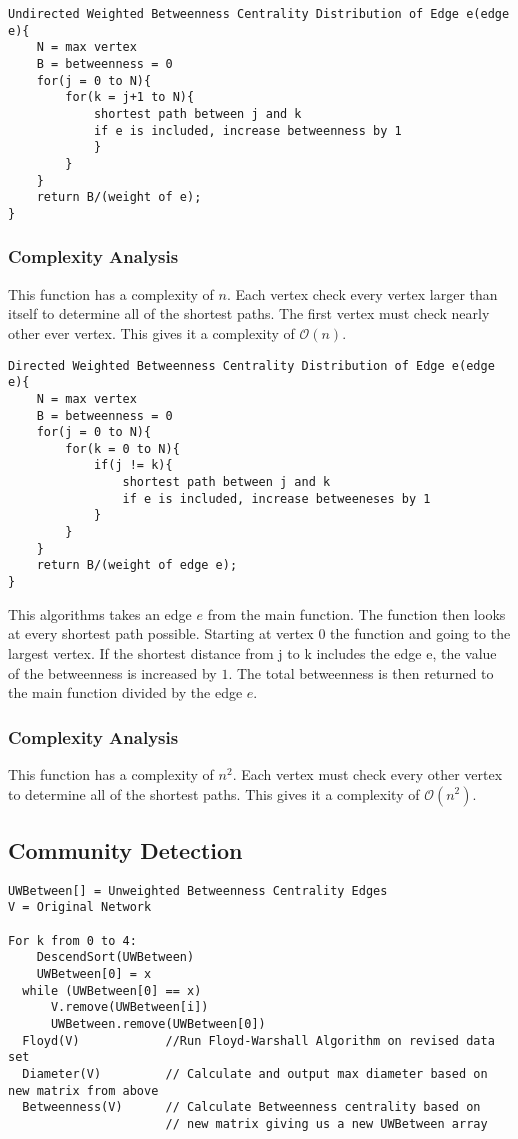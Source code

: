 \documentclass{article}
\begin{document}
\begin{verbatim}
Undirected Weighted Betweenness Centrality Distribution of Edge e(edge e){
    N = max vertex
    B = betweenness = 0
    for(j = 0 to N){
        for(k = j+1 to N){
            shortest path between j and k
            if e is included, increase betweenness by 1
            }
        }
    }
    return B/(weight of e);
}
\end{verbatim}

\subsubsection{Complexity Analysis}
This function has a complexity of $n$. Each vertex check every vertex larger than itself to determine all of the shortest paths. The first vertex must check nearly other ever vertex. This gives it a complexity of $\mathcal{O}(n)$.

\begin{verbatim}
Directed Weighted Betweenness Centrality Distribution of Edge e(edge e){
    N = max vertex
    B = betweenness = 0
    for(j = 0 to N){
        for(k = 0 to N){
            if(j != k){
                shortest path between j and k
                if e is included, increase betweeneses by 1
            }
        }
    }
    return B/(weight of edge e);
}
\end{verbatim}

This algorithms takes an edge $e$ from the main function. The function then looks at every shortest path possible. Starting at vertex $0$ the function and going to the largest vertex. If the shortest distance from j to k includes the edge e, the value of the betweenness is increased by $1$. The total betweenness is then returned to the main function divided by the edge $e$.

\subsubsection{Complexity Analysis}
This function has a complexity of $n^2$. Each vertex must check every other vertex to determine all of the shortest paths. This gives it a complexity of $\mathcal{O}(n^2)$.

\subsection{Community Detection}
\begin{verbatim}
UWBetween[] = Unweighted Betweenness Centrality Edges
V = Original Network

For k from 0 to 4:
    DescendSort(UWBetween)
    UWBetween[0] = x
  while (UWBetween[0] == x)
      V.remove(UWBetween[i])
      UWBetween.remove(UWBetween[0])
  Floyd(V)            //Run Floyd-Warshall Algorithm on revised data set
  Diameter(V)         // Calculate and output max diameter based on new matrix from above
  Betweenness(V)      // Calculate Betweenness centrality based on
                      // new matrix giving us a new UWBetween array
\end{verbatim}
\end{document}
